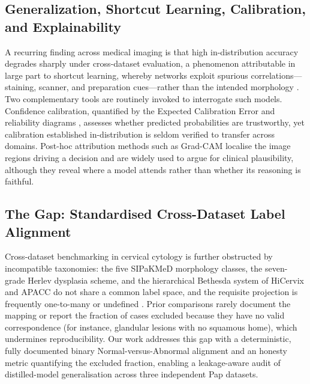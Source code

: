 \subsection{Generalization, Shortcut Learning, Calibration, and Explainability}
A recurring finding across medical imaging is that high in-distribution accuracy degrades sharply under cross-dataset evaluation, a phenomenon attributable in large part to shortcut learning, whereby networks exploit spurious correlations---staining, scanner, and preparation cues---rather than the intended morphology \citep{geirhos2020shortcut}. Two complementary tools are routinely invoked to interrogate such models. Confidence calibration, quantified by the Expected Calibration Error and reliability diagrams \citep{guo2017calibration}, assesses whether predicted probabilities are trustworthy, yet calibration established in-distribution is seldom verified to transfer across domains. Post-hoc attribution methods such as Grad-CAM \citep{selvaraju2017gradcam} localise the image regions driving a decision and are widely used to argue for clinical plausibility, although they reveal where a model attends rather than whether its reasoning is faithful.

\subsection{The Gap: Standardised Cross-Dataset Label Alignment}
Cross-dataset benchmarking in cervical cytology is further obstructed by incompatible taxonomies: the five SIPaKMeD morphology classes, the seven-grade Herlev dysplasia scheme, and the hierarchical Bethesda system of HiCervix and APACC do not share a common label space, and the requisite projection is frequently one-to-many or undefined \citep{nayar2015bethesda}. Prior comparisons rarely document the mapping or report the fraction of cases excluded because they have no valid correspondence (for instance, glandular lesions with no squamous home), which undermines reproducibility. Our work addresses this gap with a deterministic, fully documented binary Normal-versus-Abnormal alignment and an honesty metric quantifying the excluded fraction, enabling a leakage-aware audit of distilled-model generalisation across three independent Pap datasets.
